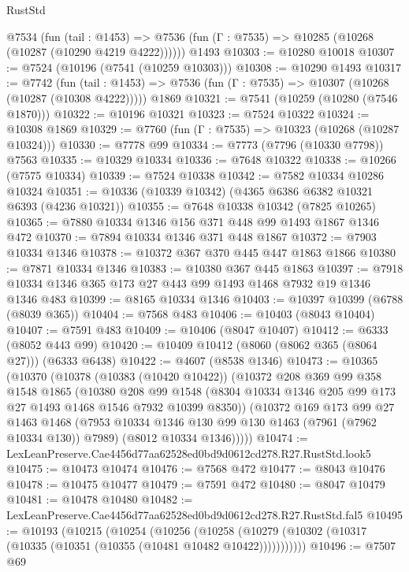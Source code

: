 \begin{lexlean}{RustStd}
\begin{coremodule}
    @7534
      (fun (tail : @1453) =>
      @7536 (fun (Γ : @7535) => @10285 (@10268 (@10287 (@10290 @4219 @4222))))))
    @1493
@10303 := @10280 @10018
@10307 := @7524 (@10196 (@7541 (@10259 @10303)))
@10308 := @10290 @1493
@10317 := @7742
    (fun (tail : @1453) => @7536 (fun (Γ : @7535) => @10307 (@10268 (@10287 (@10308 @4222)))))
    @1869
@10321 := @7541 (@10259 (@10280 (@7546 @1870)))
@10322 := @10196 @10321
@10323 := @7524 @10322
@10324 := @10308 @1869
@10329 := @7760 (fun (Γ : @7535) => @10323 (@10268 (@10287 @10324)))
@10330 := @7778 @99
@10334 := @7773 (@7796 (@10330 @7798)) @7563
@10335 := @10329 @10334
@10336 := @7648 @10322
@10338 := @10266 (@7575 @10334)
@10339 := @7524 @10338
@10342 := @7582 @10334 @10286 @10324
@10351 := @10336 (@10339 @10342) (@4365 @6386 @6382 @10321 @6393 (@4236 @10321))
@10355 := @7648 @10338 @10342 (@7825 @10265)
@10365 := @7880 @10334 @1346 @156 @371 @448 @99 @1493 @1867 @1346 @472
@10370 := @7894 @10334 @1346 @371 @448 @1867
@10372 := @7903 @10334 @1346
@10378 := @10372 @367 @370 @445 @447 @1863 @1866
@10380 := @7871 @10334 @1346
@10383 := @10380 @367 @445 @1863
@10397 := @7918 @10334 @1346 @365 @173 @27 @443 @99 @1493 @1468 @7932 @19 @1346 @1346 @483
@10399 := @8165 @10334 @1346
@10403 := @10397 @10399 (@6788 (@8039 @365))
@10404 := @7568 @483
@10406 := @10403 (@8043 @10404)
@10407 := @7591 @483
@10409 := @10406 (@8047 @10407)
@10412 := @6333 (@8052 @443 @99)
@10420 := @10409 @10412 (@8060 (@8062 @365 (@8064 @27))) (@6333 @6438)
@10422 := @4607 (@8538 @1346)
@10473 := @10365
    (@10370
      (@10378
        (@10383 (@10420 @10422))
        (@10372
          @208
          @369
          @99
          @358
          @1548
          @1865
          (@10380
            @208
            @99
            @1548
            (@8304 @10334 @1346 @205 @99 @173 @27 @1493 @1468 @1546 @7932 @10399 @8350))
          (@10372
            @169
            @173
            @99
            @27
            @1463
            @1468
            (@7953 @10334 @1346 @130 @99 @130 @1463 (@7961 (@7962 @10334 @130)) @7989)
            (@8012 @10334 @1346)))))
@10474 := LexLeanPreserve.Cae4456d77aa62528ed0bd9d0612cd278.R27.RustStd.look5
@10475 := @10473 @10474
@10476 := @7568 @472
@10477 := @8043 @10476
@10478 := @10475 @10477
@10479 := @7591 @472
@10480 := @8047 @10479
@10481 := @10478 @10480
@10482 := LexLeanPreserve.Cae4456d77aa62528ed0bd9d0612cd278.R27.RustStd.fal5
@10495 := @10193
    (@10215
      (@10254
        (@10256
          (@10258 (@10279 (@10302 (@10317 (@10335 (@10351 (@10355 (@10481 @10482 @10422)))))))))))
@10496 := @7507 @69

\end{coremodule}
\end{lexlean}
